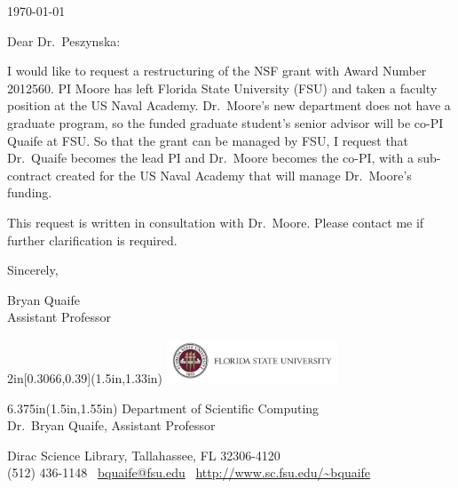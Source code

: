 \documentclass{article}
\begin{document}
\today
\bigskip

Dear Dr.~Peszynska:

I would like to request a restructuring of the NSF grant with Award
Number 2012560. PI Moore has left Florida State University (FSU) and
taken a faculty position at the US Naval Academy. Dr.~Moore's new
department does not have a graduate program, so the funded graduate
student's senior advisor will be co-PI Quaife at FSU. So that the grant
can be managed by FSU, I request that Dr.~Quaife becomes the lead PI and
Dr.~Moore becomes the co-PI, with a sub-contract created for the US Naval Academy that will manage Dr.~Moore's funding.


This request is written in consultation with Dr.~Moore. Please contact
me if further clarification is required.

Sincerely,
\vspace{2\baselineskip}

Bryan Quaife \\
Assistant Professor


\begin{textblock*}{2in}[0.3066,0.39](1.5in,1.33in)
\includegraphics[width=2in]{fsu_logo}
\end{textblock*}
\begin{textblock*}{6.375in}(1.5in,1.55in)
\sffamily
\hfill \color{fsugarnet} Department of Scientific Computing \\
\hfill Dr.~Bryan Quaife,
Assistant Professor
\end{textblock*}

\vfill
{\footnotesize\color{fsugarnet} Dirac Science Library, Tallahassee, FL
32306-4120 \\
[-0.1\baselineskip]
(512) 436-1148 \textbullet\
\url{bquaife@fsu.edu}
\textbullet\
\url{http://www.sc.fsu.edu/~bquaife}
}
\end{document}
